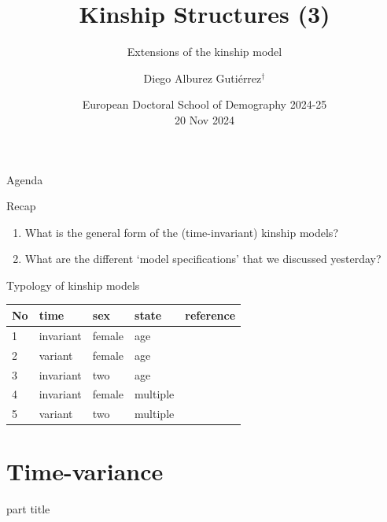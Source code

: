 ﻿\documentclass{beamer}
\title[Kinship]{Kinship Structures (3)}
\subtitle{Extensions of the kinship model}
\author{Diego Alburez Guti\'errez$^{\dagger}$}
\institute{$^{\dagger}$Kinship Inequalities Research Group, \\ Max Planck Institute for Demographic Research }
\date{European Doctoral School of Demography 2024-25 \\ 20 Nov 2024}
\begin{document}
 \begin{frame}[t,plain]
 \titlepage
 \end{frame}

 
\begin{frame}{Agenda}
\tableofcontents
\end{frame}

\begin{frame}{Recap}
    \begin{enumerate}
        \item What is the general form of the (time-invariant) kinship models?
        \item What are the different `model specifications' that we discussed yesterday?
    \end{enumerate}
\end{frame}

\begin{frame}{Typology of kinship models}

\begin{table}[]
\begin{tabular}{@{}lllll@{}}
\toprule
No & time      & sex    & state    & reference \\ \midrule
1 & invariant & female & age & \\ 
2 & variant   & female & age &  \\
3 & invariant & two   & age &  \\
4 & invariant   & female   &  multiple &  \\ 
5 & variant   & two   &  multiple & \\ \bottomrule
\end{tabular}
\end{table}

\end{frame}

\section{Time-variance}
\begin{frame}
    \begin{centering}
    \begin{beamercolorbox}[sep=12pt,center]{part title}
    \insertsection\par
    \end{beamercolorbox}
    \end{centering}
\end{frame}
\end{document}
